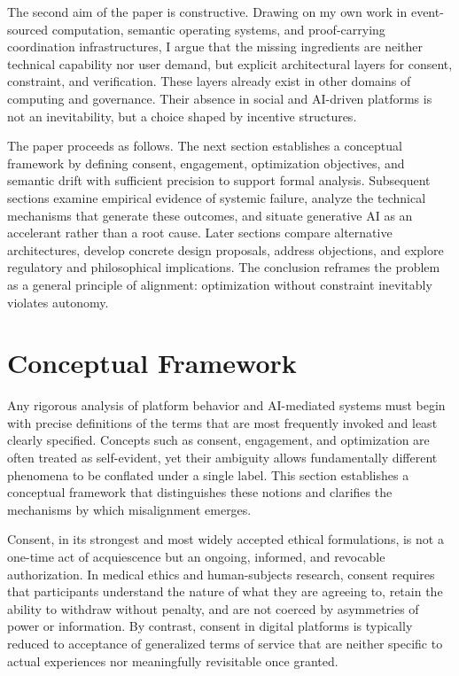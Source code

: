 \documentclass[11pt,oneside]{article}
\begin{document}
The second aim of the paper is constructive. Drawing on my own work in event-sourced computation, semantic operating systems, and proof-carrying coordination infrastructures, I argue that the missing ingredients are neither technical capability nor user demand, but explicit architectural layers for consent, constraint, and verification. These layers already exist in other domains of computing and governance. Their absence in social and AI-driven platforms is not an inevitability, but a choice shaped by incentive structures.

The paper proceeds as follows. The next section establishes a conceptual framework by defining consent, engagement, optimization objectives, and semantic drift with sufficient precision to support formal analysis. Subsequent sections examine empirical evidence of systemic failure, analyze the technical mechanisms that generate these outcomes, and situate generative AI as an accelerant rather than a root cause. Later sections compare alternative architectures, develop concrete design proposals, address objections, and explore regulatory and philosophical implications. The conclusion reframes the problem as a general principle of alignment: optimization without constraint inevitably violates autonomy.

\section{Conceptual Framework}

Any rigorous analysis of platform behavior and AI-mediated systems must begin with precise definitions of the terms that are most frequently invoked and least clearly specified. Concepts such as consent, engagement, and optimization are often treated as self-evident, yet their ambiguity allows fundamentally different phenomena to be conflated under a single label. This section establishes a conceptual framework that distinguishes these notions and clarifies the mechanisms by which misalignment emerges.

Consent, in its strongest and most widely accepted ethical formulations, is not a one-time act of acquiescence but an ongoing, informed, and revocable authorization. In medical ethics and human-subjects research, consent requires that participants understand the nature of what they are agreeing to, retain the ability to withdraw without penalty, and are not coerced by asymmetries of power or information. By contrast, consent in digital platforms is typically reduced to acceptance of generalized terms of service that are neither specific to actual experiences nor meaningfully revisitable once granted.
\end{document}
